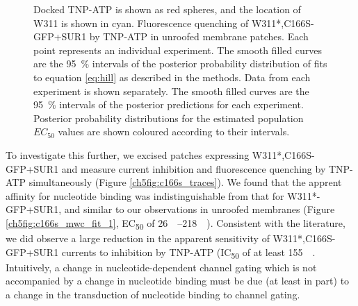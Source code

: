 \begin{figure}[h]
{	Docked TNP-ATP is shown as red spheres, and the location of W311 is shown in cyan.
	 Fluorescence quenching of W311*,C166S-GFP+SUR1 by TNP-ATP in unroofed membrane patches.
	Each point represents an individual experiment.
	The smooth filled curves are the \SI{95}{\percent} intervals of the posterior probability distribution of fits to equation \ref{eq:hill} as described in the methods.
	 Data from each experiment is shown separately.
	The smooth filled curves are the \SI{95}{\percent} intervals of the posterior predictions for each experiment.
	 Posterior probability distributions for the estimated population $EC_{50}$ values are shown coloured according to their intervals.
	}\label{ch5fig:c166s_1}
\end{figure}

To investigate this further, we excised patches expressing W311*,C166S-GFP+SUR1 and measure current inhibition and fluorescence quenching by TNP-ATP simultaneously (Figure \ref{ch5fig:c166s_traces}).
We found that the apprent affinity for nucleotide binding was indistinguishable from that for W311*-GFP+SUR1, and similar to our observations in unroofed membranes (Figure \ref{ch5fig:c166s_mwc_fit_1}, EC\textsubscript{50} of \SIrange{26}{218}{\micro\Molar}).
Consistent with the literature, we did observe a large reduction in the apparent sensitivity of W311*,C166S-GFP+SUR1 currents to inhibition by TNP-ATP (IC\textsubscript{50} of at least \SI{155}{\micro\Molar}.
Intuitively, a change in nucleotide-dependent channel gating which is not accompanied by a change in nucleotide binding must be due (at least in part) to a change in the transduction of nucleotide binding to channel gating.

